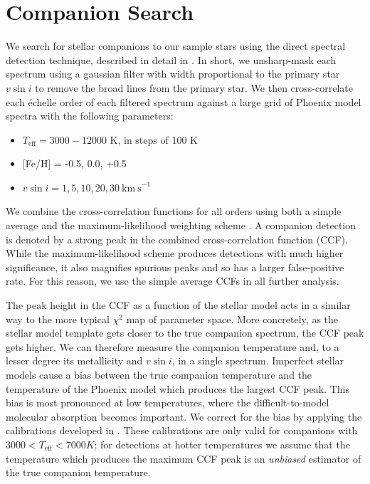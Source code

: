 \documentclass{emulateapj}
\begin{document}
\section{Companion Search}
\label{sec:companions}

We search for stellar companions to our sample stars using the direct spectral detection technique, described in detail in \citet{Gullikson2016}. In short, we unsharp-mask each spectrum using a gaussian filter with width proportional to the primary star $v\sin{i}$ to remove the broad lines from the primary star. We then cross-correlate each \'echelle order of each filtered spectrum against a large grid of Phoenix model spectra \citep{Husser2013_b} with the following parameters:

\begin{itemize}
\item $T_\mathrm{eff} = 3000-12000$ K, in steps of 100 K
\item {[}Fe/H{]} = -0.5, 0.0, +0.5
\item $v\sin{i} = 1, 5, 10, 20, 30 \ \mathrm{km\ s}^{-1}$
\end{itemize}


We combine the cross-correlation functions for all orders using both a simple average and the maximum-likelihood weighting scheme \citep{Zucker2003}. A companion detection is denoted by a strong peak in the combined cross-correlation function (CCF). While the maximum-likelihood scheme produces detections with much higher significance, it also magnifies spurious peaks and so has a larger false-positive rate. For this reason, we use the simple average CCFs in all further analysis.

The peak height in the CCF as a function of the stellar model acts in a similar way to the more typical $\chi^2$ map of parameter space. More concretely, as the stellar model template gets closer to the true companion spectrum, the CCF peak gets higher. We can therefore measure the companion temperature and, to a lesser degree its metallicity and $v\sin{i}$, in a single spectrum. Imperfect stellar models cause a bias between the true companion temperature and the temperature of the Phoenix model which produces the largest CCF peak. This bias is most pronounced at low temperatures, where the difficult-to-model molecular absorption becomes important. We correct for the bias by applying the calibrations developed in \citet{Gullikson2016}. These calibrations are only valid for companions with $3000 < T_\mathrm{eff} < 7000 K$; for detections at hotter temperatures we assume that the temperature which produces the maximum CCF peak is an \emph{unbiased} estimator of the true companion temperature.
\end{document}
